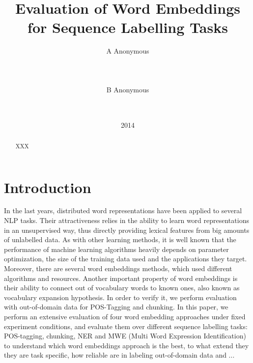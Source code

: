 \documentclass[11pt]{article}
\title{Evaluation of Word Embeddings for Sequence Labelling Tasks}
\author{A Anonymous 
   \\%
   \\ %
   \\ %
  \\ %
\And
  B Anonymous
   \\%
   \\%
   \\ %
}
\date{2014}
\begin{document}
\maketitle
\begin{abstract}
XXX
\end{abstract}

\newcommand{\gabi}[1]{\textcolor{blue}{#1}}
\newcommand{\tim}[1]{\textcolor{red}{#1}}
\newcommand{\lizhen}[1]{\textcolor{green}{#1}}
\newcommand{\nss}[1]{\textcolor{magenta}{#1}}

\section{Introduction}
In the last years, distributed word representations
have been applied to several NLP tasks.
Their attractiveness relies in the ability to learn word representations in an unsupervised way, thus directly providing lexical features from big amounts of unlabelled data. 
As with other learning methods, it is well known that
the performance of machine learning algorithms heavily depends on
parameter optimization, the size of the training data used and the applications they target.
Moreover, there are several word embeddings methods, which used different 
algorithms and resources. 
Another important property of word embeddings is their ability to connect out of vocabulary words to known ones, also known as vocabulary expansion hypothesis. 
In order to verify it, we perform evaluation
with out-of-domain data for POS-Tagging and chunking.
In this paper, we perform an extensive evaluation of four word embedding
approaches under fixed experiment conditions, and evaluate them over
different sequence labelling tasks: POS-tagging, chunking, 
NER and MWE (Multi Word Expression Identification) to understand 
which word embeddings approach is the best, to what extend they
they are task specific, how reliable are in labeling out-of-domain data
and ...

 

 

\end{document}
